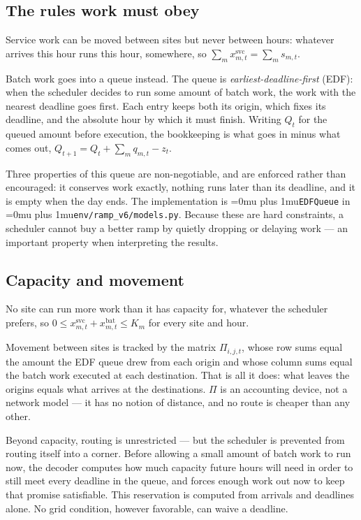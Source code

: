 ﻿\documentclass[12pt]{article}
\newcommand{\codepath}[1]{{\Urlmuskip=0mu plus 1mu\relax\nolinkurl{#1}}}
\begin{document}
\subsection{The rules work must obey}
\label{subsec:problem-workload-semantics}

Service work can be moved between sites but never between hours: whatever
arrives this hour runs this hour, somewhere, so
\(\sum_m x^{\mathrm{svc}}_{m,t}=\sum_m s_{m,t}\).

Batch work goes into a queue instead. The queue is
\emph{earliest-deadline-first} (EDF): when the scheduler decides to run some
amount of batch work, the work with the nearest deadline goes first. Each entry
keeps both its origin, which fixes its deadline, and the absolute hour by which
it must finish. Writing \(Q_t\) for the queued amount before execution, the
bookkeeping is what goes in minus what comes out,
\(Q_{t+1}=Q_t+\sum_m q_{m,t}-z_t\).

Three properties of this queue are non-negotiable, and are enforced rather than
encouraged: it conserves work exactly, nothing runs later than its deadline, and
it is empty when the day ends. The implementation is \codepath{EDFQueue} in
\codepath{env/ramp_v6/models.py}. Because these are hard constraints, a
scheduler cannot buy a better ramp by quietly dropping or delaying work --- an
important property when interpreting the results.

\subsection{Capacity and movement}
\label{subsec:problem-feasibility}

No site can run more work than it has capacity for, whatever the scheduler
prefers, so \(0\leq x^{\mathrm{svc}}_{m,t}+x^{\mathrm{bat}}_{m,t}\leq K_m\) for
every site and hour.

Movement between sites is tracked by the matrix \(\Pi_{i,j,t}\), whose row sums
equal the amount the EDF queue drew from each origin and whose column sums equal
the batch work executed at each destination. That is all it does: what leaves
the origins equals what arrives at the destinations. \(\Pi\) is an accounting
device, not a network model --- it has no notion of distance, and no route is
cheaper than any other.

Beyond capacity, routing is unrestricted --- but the scheduler is prevented from
routing itself into a corner. Before allowing a small amount of batch work to
run now, the decoder computes how much capacity future hours will need in order
to still meet every deadline in the queue, and forces enough work out now to
keep that promise satisfiable. This reservation is computed from arrivals and
deadlines alone. No grid condition, however favorable, can waive a deadline.
\end{document}
